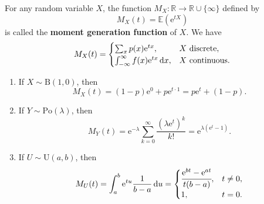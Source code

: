 \documentclass[letter-paper]{tufte-book}
\newenvironment{example}[1][Example]{\begin{trivlist}
\item[\hskip \labelsep {\bfseries #1}]}{\end{trivlist}}
\newcommand{\ex}{\mathrm{e}}
\newcommand\Def[1]{\textbf{#1}}
\begin{document}
For any random variable $X$, the function $M_X : \mathbb{R}\to\mathbb{R} \cup
\{\infty\}$ defined by
\begin{equation*}
  M_X (t) = \mathbb{E}\left(\ex^{tX}\right)
\end{equation*}
is called the \Def{moment generation function} of $X$. We have
\begin{equation*}
  M_X(t) =
    \begin{cases}
      \sum_x p(x)\ex^{tx}, & X\ \textnormal{discrete},\\
      \int_{-\infty}^\infty f(x) \ex^{tx}\, \mathrm{d}x, 
        & X\ \textnormal{continuous}.
    \end{cases}
\end{equation*}

\begin{example}
  \begin{enumerate}
    \item If $X\sim\mbox{B}(1,0)$, then
    \begin{equation*}
      M_X(t) = (1-p)\ex^0 + p\ex^{t\cdot1} = p\ex^t + (1-p).
    \end{equation*}
    
    \item If $Y\sim\mbox{Po}(\lambda)$, then
    \begin{equation*}
      M_Y(t) = \ex^{-\lambda}\sum_{k=0}^\infty \frac{(\lambda\ex^{t})^k}{k!}
      = \ex^{\lambda(\ex^{t} - 1)}.
    \end{equation*}
    
    \item If $U \sim \mbox{U}(a,b)$, then
    \begin{equation*}
      M_U(t) = \int_a^b \ex^{tu}\frac{1}{b-a}\, \mathrm{d}u =
      \begin{cases}
        \cfrac{\ex^{bt} - \ex^{at}}{t(b-a)}, & t \neq 0,\\
        1, & t = 0.
      \end{cases}
    \end{equation*}
  \end{enumerate}
\end{example}
\end{document}
